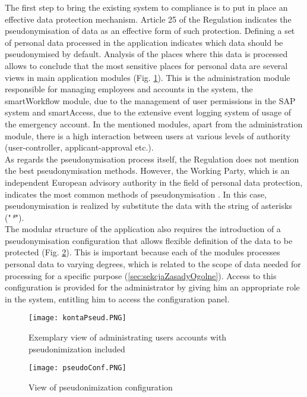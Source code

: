 \documentclass[en, noamssymb]{mgr}
\begin{document}
The first step to bring the existing system to compliance is to put in place an effective data protection mechanism. Article 25 of the Regulation indicates the pseudonymisation of data as an effective form of such protection. Defining a set of personal data processed in the application indicates which data should be pseudonymised by default. Analysis of the places where this data is processed allows to conclude that the most sensitive places for personal data are several views in main application modules (Fig. \ref{fig:accountsAdministrationPseudonimized}). This is the administration module responsible for managing employees and accounts in the system, the smartWorkflow module, due to the management of user permissions in the SAP system and smartAccess, due to the extensive event logging system of usage of the emergency account. In the mentioned modules, apart from the administration module, there is a high interaction between users at various levels of authority (user-controller, applicant-approval etc.).\\
\indent As regards the pseudonymisation process itself, the Regulation does not mention the best pseudonymisation methods. However, the Working Party, which is an independent European advisory authority in the field of personal data protection, indicates the most common methods of pseudonymisation \cite{pseudonimizacja_2017}. In this case, pseudonymisation is realized by substitute the data with the string of asterisks ("\textit{*}").\\
\indent The modular structure of the application also requires the introduction of a pseudonymisation configuration that allows flexible definition of the data to be protected (Fig. \ref{fig:pseudonimizationConf}). This is important because each of the modules processes personal data to varying degrees, which is related to the scope of data needed for processing for a specific purpose (\ref{sec:sekcjaZasadyOgolne}). Access to this configuration is provided for the administrator by giving him an appropriate role in the system, entitling him to access the configuration panel.

\begin{figure}[H]
	\centering
	\texttt{[image: kontaPseud.PNG]}
	\caption[Exemplary view of administrating users accounts with pseudonimization included]{Exemplary view of administrating users accounts with pseudonimization included}
	\label{fig:accountsAdministrationPseudonimized}
\end{figure}

\begin{figure}[H]
	\centering
	\texttt{[image: pseudoConf.PNG]}
	\caption[View of pseudonimization configuration]{View of pseudonimization configuration}
	\label{fig:pseudonimizationConf}
\end{figure}
\end{document}
